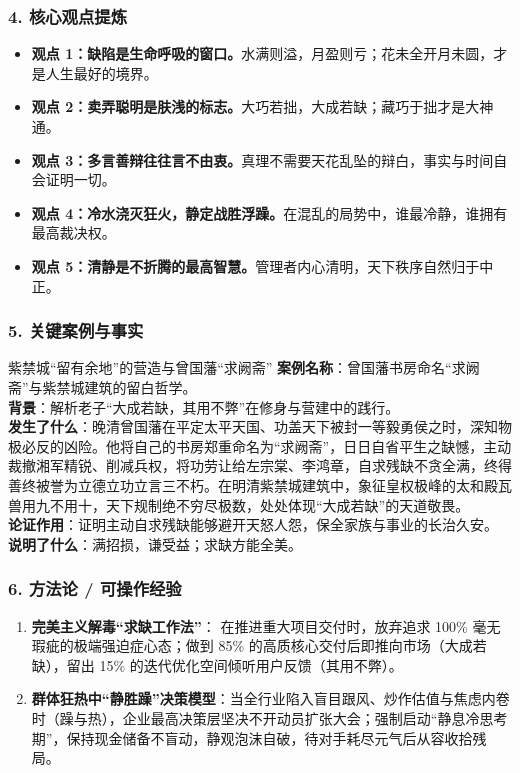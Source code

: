 \subsubsection{4. 核心观点提炼}
\begin{itemize}
    \item \textbf{观点 1：缺陷是生命呼吸的窗口。}水满则溢，月盈则亏；花未全开月未圆，才是人生最好的境界。
    \item \textbf{观点 2：卖弄聪明是肤浅的标志。}大巧若拙，大成若缺；藏巧于拙才是大神通。
    \item \textbf{观点 3：多言善辩往往言不由衷。}真理不需要天花乱坠的辩白，事实与时间自会证明一切。
    \item \textbf{观点 4：冷水浇灭狂火，静定战胜浮躁。}在混乱的局势中，谁最冷静，谁拥有最高裁决权。
    \item \textbf{观点 5：清静是不折腾的最高智慧。}管理者内心清明，天下秩序自然归于中正。
\end{itemize}

\subsubsection{5. 关键案例与事实}
\begin{CaseBox}{紫禁城“留有余地”的营造与曾国藩“求阙斋”}
\textbf{案例名称}：曾国藩书房命名“求阙斋”与紫禁城建筑的留白哲学。\\
\textbf{背景}：解析老子“大成若缺，其用不弊”在修身与营建中的践行。\\
\textbf{发生了什么}：晚清曾国藩在平定太平天国、功盖天下被封一等毅勇侯之时，深知物极必反的凶险。他将自己的书房郑重命名为“求阙斋”，日日自省平生之缺憾，主动裁撤湘军精锐、削减兵权，将功劳让给左宗棠、李鸿章，自求残缺不贪全满，终得善终被誉为立德立功立言三不朽。在明清紫禁城建筑中，象征皇权极峰的太和殿瓦兽用九不用十，天下规制绝不穷尽极数，处处体现“大成若缺”的天道敬畏。\\
\textbf{论证作用}：证明主动自求残缺能够避开天怒人怨，保全家族与事业的长治久安。\\
\textbf{说明了什么}：满招损，谦受益；求缺方能全美。
\end{CaseBox}

\subsubsection{6. 方法论 / 可操作经验}
\begin{enumerate}
    \item \textbf{完美主义解毒“求缺工作法”}：
    在推进重大项目交付时，放弃追求 100\% 毫无瑕疵的极端强迫症心态；做到 85\% 的高质核心交付后即推向市场（大成若缺），留出 15\% 的迭代优化空间倾听用户反馈（其用不弊）。
    \item \textbf{群体狂热中“静胜躁”决策模型}：当全行业陷入盲目跟风、炒作估值与焦虑内卷时（躁与热），企业最高决策层坚决不开动员扩张大会；强制启动“静息冷思考期”，保持现金储备不盲动，静观泡沫自破，待对手耗尽元气后从容收拾残局。
\end{enumerate}

